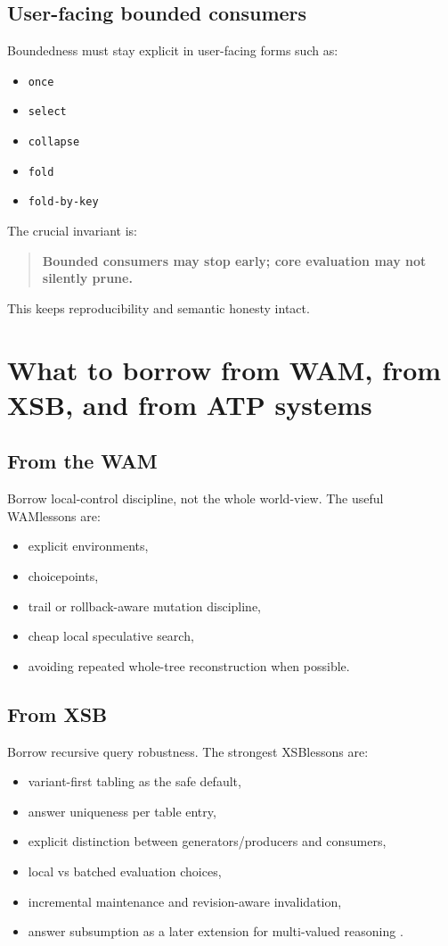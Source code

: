 \documentclass[11pt]{article}
\newcommand{\XSB}{\textsc{XSB}}
\newcommand{\WAM}{\textsc{WAM}}
\begin{document}
\subsection{User-facing bounded consumers}
Boundedness must stay explicit in user-facing forms such as:
\begin{itemize}
    \item \texttt{once}
    \item \texttt{select}
    \item \texttt{collapse}
    \item \texttt{fold}
    \item \texttt{fold-by-key}
\end{itemize}

The crucial invariant is:
\begin{quote}
\textbf{Bounded consumers may stop early; core evaluation may not silently prune.}
\end{quote}

This keeps reproducibility and semantic honesty intact.

\section{What to borrow from \WAM, from \XSB, and from ATP systems}
\subsection{From the \WAM}
Borrow local-control discipline, not the whole world-view.
The useful \WAM lessons are:
\begin{itemize}
    \item explicit environments,
    \item choicepoints,
    \item trail or rollback-aware mutation discipline,
    \item cheap local speculative search,
    \item avoiding repeated whole-tree reconstruction when possible.
\end{itemize}

\subsection{From \XSB}
Borrow recursive query robustness.
The strongest \XSB lessons are:
\begin{itemize}
    \item variant-first tabling as the safe default,
    \item answer uniqueness per table entry,
    \item explicit distinction between generators/producers and consumers,
    \item local vs batched evaluation choices,
    \item incremental maintenance and revision-aware invalidation,
    \item answer subsumption as a later extension for multi-valued reasoning \cite{xsb_about,xsb_definite,xsb_aggregation}.
\end{itemize}
\end{document}
